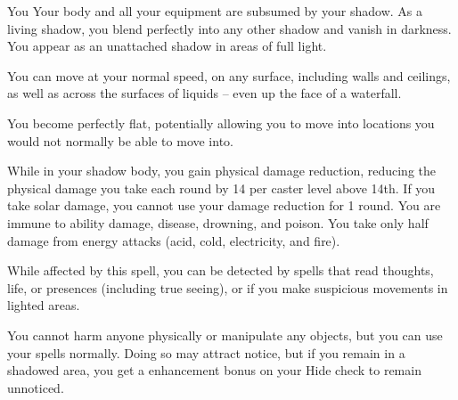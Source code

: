 \begin{spellheader}
    \spelldur{\durmed \dismissable}
\end{spellheader}
\begin{spelleffects}
    \begin{spelltarget}{You}
        \spelleffect Your body and all your equipment are subsumed by your shadow. As a living shadow, you blend perfectly into any other shadow and vanish in darkness. You appear as an unattached shadow in areas of full light.
        \par You can move at your normal speed, on any surface, including walls and ceilings, as well as across the surfaces of liquids -- even up the face of a waterfall.
        \par You become perfectly flat, potentially allowing you to move into locations you would not normally be able to move into.
        \par While in your shadow body, you gain physical damage reduction, reducing the physical damage you take each round by 14  per caster level above 14th. If you take solar damage, you cannot use your damage reduction for 1 round. You are immune to ability damage, disease, drowning, and poison. You take only half damage from energy attacks (acid, cold, electricity, and fire).
        \par While affected by this spell, you can be detected by spells that read thoughts, life, or presences (including true seeing), or if you make suspicious movements in lighted areas.
        \par You cannot harm anyone physically or manipulate any objects, but you can use your spells normally. Doing so may attract notice, but if you remain in a shadowed area, you get a  enhancement bonus on your Hide check to remain unnoticed.
    \end{spelltarget}
\end{spelleffects}
\begin{spellfooter}
    
\end{spellfooter}

